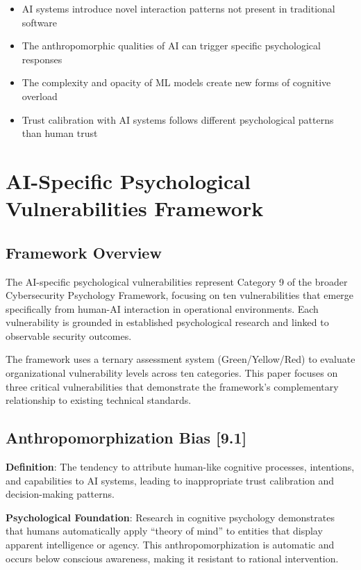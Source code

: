 \documentclass[11pt,a4paper]{article}
\begin{document}
\begin{itemize}
\item AI systems introduce novel interaction patterns not present in traditional software
\item The anthropomorphic qualities of AI can trigger specific psychological responses
\item The complexity and opacity of ML models create new forms of cognitive overload
\item Trust calibration with AI systems follows different psychological patterns than human trust
\end{itemize}

\section{AI-Specific Psychological Vulnerabilities Framework}

\subsection{Framework Overview}

The AI-specific psychological vulnerabilities represent Category 9 of the broader Cybersecurity Psychology Framework\cite{canale2025}, focusing on ten vulnerabilities that emerge specifically from human-AI interaction in operational environments. Each vulnerability is grounded in established psychological research and linked to observable security outcomes.

The framework uses a ternary assessment system (Green/Yellow/Red) to evaluate organizational vulnerability levels across ten categories. This paper focuses on three critical vulnerabilities that demonstrate the framework's complementary relationship to existing technical standards.

\subsection{Anthropomorphization Bias [9.1]}

\textbf{Definition}: The tendency to attribute human-like cognitive processes, intentions, and capabilities to AI systems, leading to inappropriate trust calibration and decision-making patterns.

\textbf{Psychological Foundation}: Research in cognitive psychology demonstrates that humans automatically apply ``theory of mind'' to entities that display apparent intelligence or agency\cite{premack1978}. This anthropomorphization is automatic and occurs below conscious awareness, making it resistant to rational intervention.
\end{document}
